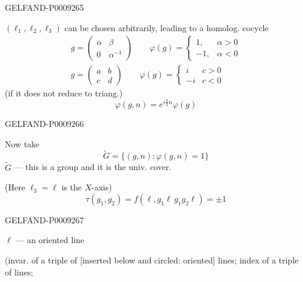 \begin{GelfandAdjacentEvidence}{GELFAND-P000926}{5}


$(\ell_1,\ell_2,\ell_3)$ can be chosen arbitrarily, leading to a homolog. cocycle
\begin{gather*}
 g=\begin{pmatrix}\alpha&\beta\\0&\alpha^{-1}\end{pmatrix}
 \qquad
 \varphi(g)=\begin{cases}1,&\alpha>0\\-1,&\alpha<0\end{cases}\\[4pt]
 g=\begin{pmatrix}a&b\\c&d\end{pmatrix}
 \qquad
 \varphi(g)=\begin{cases}i&c>0\\-i&c<0\end{cases}
\end{gather*}
(if it does not reduce to triang.)
\[
 \varphi(g,n)=e^{i\frac{\pi}{2}n}\varphi(g)
\]
\end{GelfandAdjacentEvidence}
\begin{GelfandAdjacentEvidence}{GELFAND-P000926}{6}


Now take
\[
 \widetilde G=\{(g,n):\varphi(g,n)=1\}
\]
$\widetilde G$ --- this is a group and it is the univ. cover.

\medskip
[at right]
(Here $\ell_3=\ell$ is the $X$-axis)
\[
 \tau(g_1,g_2)=f(\ell,g_1\ell\,g_1g_2\ell)=\pm1
\]
\end{GelfandAdjacentEvidence}
\begin{GelfandAdjacentEvidence}{GELFAND-P000926}{7}


$\ell$ --- an oriented line

(invar. of a triple of [inserted below and circled: oriented] lines; index of a triple of lines;
\end{GelfandAdjacentEvidence}
